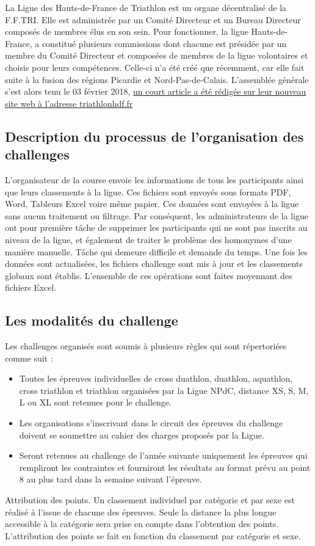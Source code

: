 \documentclass[12pt,a4paper]{report}
\begin{document}
	La Ligue des Hauts-de-France de Triathlon est un organe décentralisé de la F.F.TRI. Elle est administrée par un Comité Directeur et un Bureau Directeur composés de membres élus en son sein. 
	Pour fonctionner, la ligue Hauts-de-France, a constitué plusieurs commissions dont chacune est présidée par un membre du Comité Directeur et composées de membres de la ligue volontaires et choisis pour leurs compétences.
	Celle-ci n'a été créé que récemment, car elle fait suite à la fusion des régions Picardie et Nord-Pas-de-Calais.
	L'assemblée générale s'est alors tenu le 03 février 2018, \href{http://triathlonhdf.fr/samedi-03-fevrier-2018-la-ligue-des-hauts-de-france-de-triathlon-est-creee/}{un court article a été rédigée sur leur nouveau site web à l'adresse triathlonhdf.fr} \cite{ref1}
	
	\subsection{Description du processus de l’organisation des challenges }
	L’organisateur de la course envoie les informations de tous les participants ainsi que leurs classements à la ligue. Ces fichiers sont envoyés sous formats PDF, Word, Tableurs Excel voire même papier.  Ces données sont envoyées à la ligue sans aucun traitement ou filtrage. Par conséquent, les administrateurs de la ligue ont pour première tâche de supprimer les participants qui ne sont pas inscrits au niveau de la ligue, et également de traiter le problème des homonymes d’une manière manuelle. Tâche qui demeure difficile et demande du temps.
	Une fois les données sont actualisées, les fichiers challenge sont mis à jour et les classements globaux sont établis. L’ensemble de ces opérations sont faites moyennant des fichiers Excel.
	
	
	\subsection{Les modalités du challenge  }
	Les challenges organisés sont soumis à plusieurs règles qui sont répertoriées comme suit :
	\begin{itemize} 
	\item 	Toutes les épreuves individuelles de cross duathlon, duathlon, aquathlon, cross triathlon et triathlon organisées par la Ligue NPdC, distance XS, S, M, L ou XL sont retenues pour le challenge.
	\item 	Les organisations s'inscrivant dans le circuit des épreuves du challenge doivent se soumettre au cahier des charges proposés par la Ligue.
	 \item  Seront retenues au challenge de l’année suivante uniquement les épreuves qui rempliront les contraintes et fourniront les résultats au format prévu au point 8 au plus tard dans la semaine suivant l’épreuve.
	
	\end{itemize} 
\newpage
	 Attribution des points. Un classement individuel par catégorie et par sexe est réalisé à l’issue de chacune des épreuves. Seule la distance la plus longue accessible à la catégorie sera prise en compte dans l’obtention des points.\\
	L’attribution des points se fait en fonction du classement par catégorie et sexe. 
	
\end{document}
